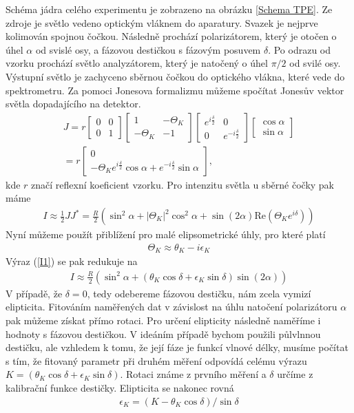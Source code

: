 Schéma jádra celého experimentu je zobrazeno na obrázku \ref{Schema TPE}. Ze zdroje je světlo vedeno optickým vláknem do aparatury. Svazek je nejprve kolimován spojnou čočkou. Následně prochází polarizátorem, který je otočen o úhel $\alpha$ od svislé osy, a fázovou destičkou s fázovým posuvem $\delta$. Po odrazu od vzorku prochází světlo analyzátorem, který je natočený o úhel $\pi/2$ od svilé osy. Výstupní světlo je zachyceno sběrnou čočkou do optického vlákna, které vede do spektrometru. Za pomoci Jonesova formalizmu můžeme spočítat Jonesův vektor světla dopadajícího na detektor.
\begin{eqnarray}
J=r\begin{bmatrix}0&0\\0&1\end{bmatrix}\begin{bmatrix}1&-\Theta_K\\-\Theta_K&-1\end{bmatrix}\begin{bmatrix}e^{i\frac{\delta}{2}}&0\\0&e^{-i\frac{\delta}{2}}\end{bmatrix}\begin{bmatrix}\cos\alpha\\\sin\alpha\end{bmatrix}\\
=r\begin{bmatrix}0\\-\Theta_Ke^{i\frac{\delta}{2}}\cos\alpha+e^{-i\frac{\delta}{2}}\sin\alpha\end{bmatrix},
\end{eqnarray}
kde $r$ značí reflexní koeficient vzorku. Pro intenzitu světla u sběrné čočky pak máme
\begin{eqnarray}
I\approx\frac{1}{2}JJ^*=\frac{R}{2}(\sin^2\alpha+|\Theta_K|^2\cos^2\alpha+\sin(2\alpha)\mbox{Re}(\Theta_Ke^{i\delta}))
\label{I1}
\end{eqnarray}
Nyní můžeme použít přiblížení pro malé elipsometrické úhly, pro které platí
\begin{eqnarray}
\Theta_K\approx\theta_K-i\epsilon_K
\end{eqnarray}
Výraz (\ref{I1}) se pak redukuje na
\begin{eqnarray}
I\approx\frac{R}{2}(\sin^2\alpha+(\theta_K\cos\delta+\epsilon_K\sin\delta)\sin(2\alpha))
\label{I2}
\end{eqnarray}
V  případě, že $\delta=0$, tedy odebereme fázovou destičku, nám zcela vymizí elipticita. Fitováním naměřených dat v závislost na úhlu natočení polarizátoru $\alpha$ pak můžeme získat přímo rotaci. Pro určení elipticity následně naměříme i hodnoty s fázovou destičkou. V ideáním případě bychom použili půlvlnnou destičku, ale vzhledem k tomu, že její fáze je funkcí vlnové délky, musíme počítat s tím, že fitovaný parametr při druhém měření odpovídá celému výrazu $K=(\theta_K\cos\delta+\epsilon_K\sin\delta)$. Rotaci známe z prvního měření a $\delta$ určíme z kalibrační funkce destičky. Elipticita se nakonec rovná
\begin{eqnarray}
\epsilon_K=(K-\theta_K\cos\delta)/\sin\delta
\end{eqnarray}

